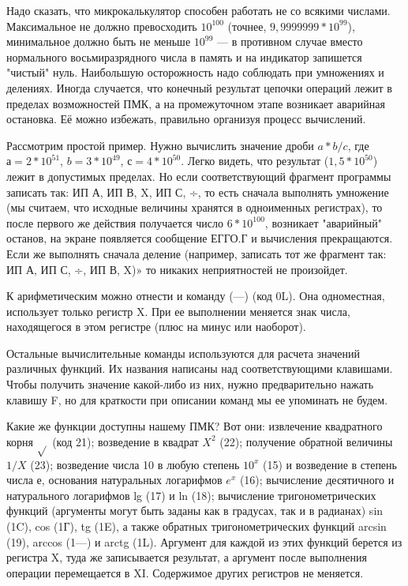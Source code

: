 \documentclass[11pt,a4paper,oneside]{article}
\begin{document}
Надо сказать, что микрокалькулятор способен работать не со всякими числами. Максимальное не должно превосходить $10^{100}$ (точнее, $9,9999999*10^{99}$), минимальное должно быть не меньше $10^{99}$ — в противном случае вместо нормального восьмиразрядного числа в память и на индикатор запишется "чистый" нуль. Наибольшую осторожность надо соблюдать при умножениях и делениях. Иногда случается, что конечный результат цепочки операций лежит в пределах возможностей ПМК, а на промежуточном этапе возникает аварийная остановка. Её можно избежать, правильно организуя процесс вычислений.

Рассмотрим простой пример. Нужно вычислить значение дроби $a*b/c$, где $а=2*10^{51}$, $b=3*10^{49}$, $с=4*10^{50}$. Легко видеть, что результат ($1,5*10^{50}$) лежит в допустимых пределах. Но если соответствующий фрагмент программы записать так: ИП А, ИП В, X, ИП С, ÷, то есть сначала выполнять умножение (мы считаем, что исходные величины хранятся в одноименных регистрах), то после первого же действия получается число $6*10^{100}$, возникает "аварийный" останов, на экране появляется сообщение ЕГГО.Г и вычисления прекращаются. Если же выполнять сначала деление (например, записать тот же фрагмент так: ИП А, ИП С, ÷, ИП В, X)» то никаких неприятностей не произойдет.

К арифметическим можно отнести и команду (—) (код 0L). Она одноместная, использует только регистр X. При ее выполнении меняется знак числа, находящегося в этом регистре (плюс на минус или наоборот).

Остальные вычислительные команды используются для расчета значений различных функций. Их названия написаны над соответствующими клавишами. Чтобы получить значение какой-либо из них, нужно предварительно нажать клавишу F, но для краткости при описании команд мы ее упоминать не будем.

Какие же функции доступны нашему ПМК? Вот они: извлечение квадратного корня $\sqrt{}$ (код 21);
возведение в квадрат $X^{2}$ (22); получение обратной величины $1/X$ (23); возведение числа 10 в любую степень $10^{x}$ (15) и возведение в степень числа е, основания натуральных логарифмов $e^{x}$ (16); вычисление десятичного и натурального логарифмов lg (17) и ln (18); вычисление тригонометрических функций (аргументы могут быть заданы как в градусах, так и в радианах) sin (1C), cos (1Г), tg (1E), а также обратных тригонометрических функций arcsin (19), arccos (1—) и arctg (1L). Аргумент для каждой из этих функций берется из регистра X, туда же записывается результат, а аргумент после выполнения операции перемещается в XI. Содержимое других регистров не меняется.
\end{document}
